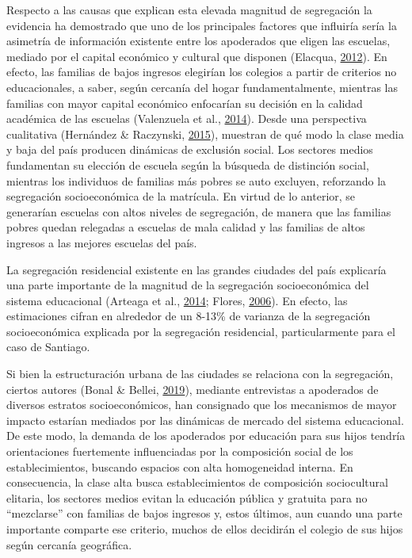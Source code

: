 \documentclass[
]{article}
\begin{document}
Respecto a las causas que explican esta elevada magnitud de segregación
la evidencia ha demostrado que uno de los principales factores que
influiría sería la asimetría de información existente entre los
apoderados que eligen las escuelas, mediado por el capital económico y
cultural que disponen (Elacqua,
\protect\hyperlink{ref-elacqua_impact_2012}{2012}). En efecto, las
familias de bajos ingresos elegirían los colegios a partir de criterios
no educacionales, a saber, según cercanía del hogar fundamentalmente,
mientras las familias con mayor capital económico enfocarían su decisión
en la calidad académica de las escuelas (Valenzuela et al.,
\protect\hyperlink{ref-valenzuela_socioeconomic_2014}{2014}). Desde una
perspectiva cualitativa (Hernández \& Raczynski,
\protect\hyperlink{ref-hernandez_eleccion_2015}{2015}), muestran de qué
modo la clase media y baja del país producen dinámicas de exclusión
social. Los sectores medios fundamentan su elección de escuela según la
búsqueda de distinción social, mientras los individuos de familias más
pobres se auto excluyen, reforzando la segregación socioeconómica de la
matrícula. En virtud de lo anterior, se generarían escuelas con altos
niveles de segregación, de manera que las familias pobres quedan
relegadas a escuelas de mala calidad y las familias de altos ingresos a
las mejores escuelas del país.

La segregación residencial existente en las grandes ciudades del país
explicaría una parte importante de la magnitud de la segregación
socioeconómica del sistema educacional (Arteaga et al.,
\protect\hyperlink{ref-arteaga_school_2014}{2014}; Flores,
\protect\hyperlink{ref-flores_consecuencias_2006}{2006}). En efecto, las
estimaciones cifran en alrededor de un 8-13\% de varianza de la
segregación socioeconómica explicada por la segregación residencial,
particularmente para el caso de Santiago.

Si bien la estructuración urbana de las ciudades se relaciona con la
segregación, ciertos autores (Bonal \& Bellei,
\protect\hyperlink{ref-bonal_understanding_2019b}{2019}), mediante
entrevistas a apoderados de diversos estratos socioeconómicos, han
consignado que los mecanismos de mayor impacto estarían mediados por las
dinámicas de mercado del sistema educacional. De este modo, la demanda
de los apoderados por educación para sus hijos tendría orientaciones
fuertemente influenciadas por la composición social de los
establecimientos, buscando espacios con alta homogeneidad interna. En
consecuencia, la clase alta busca establecimientos de composición
sociocultural elitaria, los sectores medios evitan la educación pública
y gratuita para no ``mezclarse'' con familias de bajos ingresos y, estos
últimos, aun cuando una parte importante comparte ese criterio, muchos
de ellos decidirán el colegio de sus hijos según cercanía geográfica.
\end{document}
